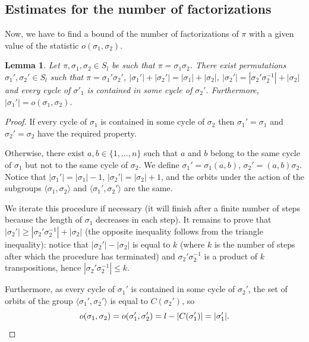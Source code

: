 \documentclass[12pt]{amsart}
\theoremstyle{plain}
\newtheorem{lemma}{Lemma}
\theoremstyle{remark}
\DeclareMathOperator{\orbits}{orbits}
\begin{document}
\subsection{Estimates for the number of factorizations}
Now, we have to find a bound of the number of factorizations of $\pi$ with a
given value of the statistic 
$o(\sigma_1,\sigma_2)$.
\begin{lemma}
\label{lem:feray}
Let $\pi,\sigma_1,\sigma_2\in S_l$ be such that $\pi=\sigma_1 \sigma_2$. 
There exist permutations $\sigma_1',\sigma_2'\in S_l$ such that
$\pi=\sigma_1' \sigma_2'$, $|\sigma_1'|+|\sigma_2'|=|\sigma_1|+|\sigma_2|$,
$|\sigma_2'|= |\sigma_2'\sigma_2^{-1} |+|\sigma_2|$   and every
cycle of $\sigma'_1$ is contained in some cycle of $\sigma_2'$.
Furthermore, $|\sigma_1'| = o(\sigma_1,\sigma_2)$.
\end{lemma}
\begin{proof}
If every cycle of $\sigma_1$ is contained in some cycle of $\sigma_2$ then $\sigma_1'=\sigma_1$ and
$\sigma_2'=\sigma_2$ have the required property.


Otherwise, there exist $a,b\in\{1,\dots,n\}$
such that $a$ and $b$ belong to the same cycle of $\sigma_1$ but not
to the same
cycle of $\sigma_2$. We define $\sigma_1'=\sigma_1 (a,b)$, $\sigma_2'=(a,b) \sigma_2$. Notice that $|\sigma_1'|=|\sigma_1|-1$,
$|\sigma_2'|=|\sigma_2|+1$, and the orbits under the action of the subgroups
$\langle \sigma_1,\sigma_2 \rangle$ and $\langle \sigma_1',\sigma_2' \rangle$
are the same. 

We iterate this procedure
if necessary (it will finish after a finite number of steps because the length of $\sigma_1$ decreases in each step). 
It remains to prove that
$|\sigma_2'| \geq |\sigma_2'\sigma_2^{-1} |+|\sigma_2|$ (the opposite
inequality follows from the triangle inequality): notice that $|\sigma_2'|-|\sigma_2|$ is equal to $k$
(where $k$ is the number of steps after which the procedure has terminated) and 
$\sigma_2'\sigma_2^{-1} $ is a product of $k$ transpositions, hence
$|\sigma_2'\sigma_2^{-1}|\leq k $.

Furthermore, as every cycle of $\sigma_1'$ is contained in some cycle of
$\sigma_2'$, the set of orbits of the group $\langle
\sigma_1',\sigma_2'\rangle$ is equal to $C(\sigma_2')$, so 
\begin{displaymath} 
o(\sigma_1,\sigma_2)= o(\sigma_1',\sigma_2')= l-
|C(\sigma_1')|= |\sigma_1'|. \qedhere
\end{displaymath}
\end{proof}
\end{document}
